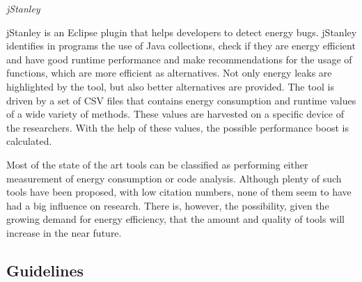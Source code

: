 \documentclass[]{book}
\begin{document}
\emph{jStanley}

jStanley is an Eclipse plugin that helps developers to detect energy
bugs. jStanley identifies in programs the use of Java collections, check
if they are energy efficient and have good runtime performance and make
recommendations for the usage of functions, which are more efficient as
alternatives. Not only energy leaks are highlighted by the tool, but
also better alternatives are provided. The tool is driven by a set of
CSV files that contains energy consumption and runtime values of a wide
variety of methods. These values are harvested on a specific device of
the researchers. With the help of these values, the possible performance
boost is calculated.

Most of the state of the art tools can be classified as performing
either measurement of energy consumption or code analysis. Although
plenty of such tools have been proposed, with low citation numbers, none
of them seem to have had a big influence on research. There is, however,
the possibility, given the growing demand for energy efficiency, that
the amount and quality of tools will increase in the near future.

\subsection{Guidelines}\label{guidelines}
\end{document}
